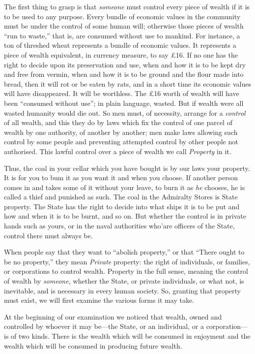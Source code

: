 \documentclass{book}
\begin{document}
The first thing to grasp is that \emph{someone} must control every piece of wealth if it is to be used to any purpose. Every bundle of economic values in the community must be under the control of some human will; otherwise those pieces of wealth “run to waste,” that is, are consumed without use to mankind. For instance, a ton of threshed wheat represents a bundle of economic values. It represents a piece of wealth equivalent, in currency measure, to say £16. If no one has the right to decide upon its preservation and use, when and how it is to be kept dry and free from vermin, when and how it is to be ground and the flour made into bread, then it will rot or be eaten by rats, and in a short time its economic values will have disappeared. It will be worthless. The £16 worth of wealth will have been “consumed without use”; in plain language, wasted. But if wealth were all wasted humanity would die out. So men must, of necessity, arrange for a \emph{control} of all wealth, and this they do by laws which fix the control of one parcel of wealth by one authority, of another by another; men make laws allowing such control by some people and preventing attempted control by other people not authorised. This lawful control over a piece of wealth we call \emph{Property} in it.

Thus, the coal in your cellar which you have bought is by our laws your property. It is for you to bum it as you want it and when you choose. If another person comes in and takes some of it without your leave, to burn it as \emph{he} chooses, he is called a thief and punished as such. The coal in the Admiralty Stores is State property. The State has the right to decide into what ships it is to be put and how and when it is to be burnt, and so on. But whether the control is in private hands such as yours, or in the naval authorities who’are officers of the State, control there must always be.

When people say that they want to “abolish property,” or that “There ought to be no property,” they mean \emph{Private} property: the right of individuals, or families, or corporations to control wealth. Property in the full sense, meaning the control of wealth by \emph{someone,} whether the State, or private individuals, or what not, is inevitable, and is necessary in every human society. So, granting that property must exist, we will first examine the various forms it may take.

At the beginning of our examination we noticed that wealth, owned and controlled by whoever it may be—the State, or an individual, or a corporation—is of two kinds. There is the wealth which will be consumed in enjoyment and the wealth which will be consumed in producing future wealth.
\end{document}
